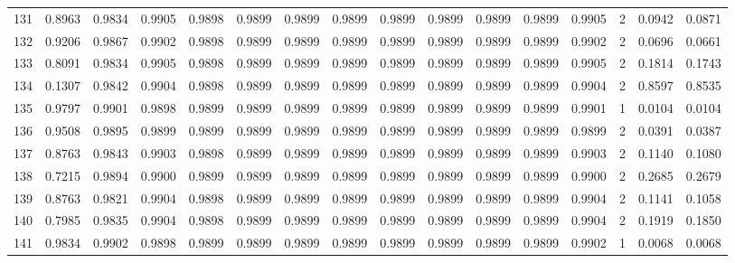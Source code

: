 \begin{tabular}{lrrrrrrrrrrrrrrr}
131 &      0.8963 &  0.9834 &  0.9905 &  0.9898 &  0.9899 &  0.9899 &  0.9899 &  0.9899 &  0.9899 &  0.9899 &   0.9899 &     0.9905 &      2 &                    0.0942 &                     0.0871 \\
132 &      0.9206 &  0.9867 &  0.9902 &  0.9898 &  0.9899 &  0.9899 &  0.9899 &  0.9899 &  0.9899 &  0.9899 &   0.9899 &     0.9902 &      2 &                    0.0696 &                     0.0661 \\
133 &      0.8091 &  0.9834 &  0.9905 &  0.9898 &  0.9899 &  0.9899 &  0.9899 &  0.9899 &  0.9899 &  0.9899 &   0.9899 &     0.9905 &      2 &                    0.1814 &                     0.1743 \\
134 &      0.1307 &  0.9842 &  0.9904 &  0.9898 &  0.9899 &  0.9899 &  0.9899 &  0.9899 &  0.9899 &  0.9899 &   0.9899 &     0.9904 &      2 &                    0.8597 &                     0.8535 \\
135 &      0.9797 &  0.9901 &  0.9898 &  0.9899 &  0.9899 &  0.9899 &  0.9899 &  0.9899 &  0.9899 &  0.9899 &   0.9899 &     0.9901 &      1 &                    0.0104 &                     0.0104 \\
136 &      0.9508 &  0.9895 &  0.9899 &  0.9899 &  0.9899 &  0.9899 &  0.9899 &  0.9899 &  0.9899 &  0.9899 &   0.9899 &     0.9899 &      2 &                    0.0391 &                     0.0387 \\
137 &      0.8763 &  0.9843 &  0.9903 &  0.9898 &  0.9899 &  0.9899 &  0.9899 &  0.9899 &  0.9899 &  0.9899 &   0.9899 &     0.9903 &      2 &                    0.1140 &                     0.1080 \\
138 &      0.7215 &  0.9894 &  0.9900 &  0.9899 &  0.9899 &  0.9899 &  0.9899 &  0.9899 &  0.9899 &  0.9899 &   0.9899 &     0.9900 &      2 &                    0.2685 &                     0.2679 \\
139 &      0.8763 &  0.9821 &  0.9904 &  0.9898 &  0.9899 &  0.9899 &  0.9899 &  0.9899 &  0.9899 &  0.9899 &   0.9899 &     0.9904 &      2 &                    0.1141 &                     0.1058 \\
140 &      0.7985 &  0.9835 &  0.9904 &  0.9898 &  0.9899 &  0.9899 &  0.9899 &  0.9899 &  0.9899 &  0.9899 &   0.9899 &     0.9904 &      2 &                    0.1919 &                     0.1850 \\
141 &      0.9834 &  0.9902 &  0.9898 &  0.9899 &  0.9899 &  0.9899 &  0.9899 &  0.9899 &  0.9899 &  0.9899 &   0.9899 &     0.9902 &      1 &                    0.0068 &                     0.0068 \\

\end{tabular}
